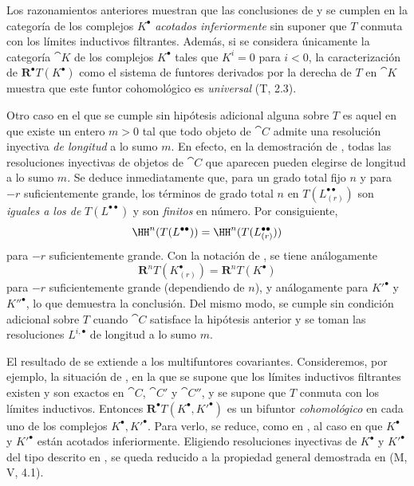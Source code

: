 \documentclass[oneside]{amsart}
\newcommand{\oldpage}[2][]{{\marginnote{\normalfont\textbf{#1}~|~#2}}\ignorespaces}
\let\EGAOriginalLabel\label
\renewcommand{\label}[1]{\phantomsection\EGAOriginalLabel{#1}}
\begin{document}
\begin{remark}[11.5.4]
\label{0.11.5.4}
Los razonamientos anteriores muestran que las conclusiones de  y  se cumplen en la categoría de los complejos $K^\bullet$ \emph{acotados inferiormente} sin suponer que $T$ conmuta con los límites inductivos filtrantes.
Además, si se considera únicamente la categoría $\cat{K}$ de los complejos $K^\bullet$ tales que $K^i=0$ para $i<0$, la caracterización de $\mathbf{R}^\bullet T(K^\bullet)$ como el sistema de funtores derivados por la derecha de $T$ en $\cat{K}$ muestra que este funtor cohomológico es \emph{universal} (T, 2.3).

Otro caso en el que  se cumple sin hipótesis adicional alguna sobre $T$ es aquel en que existe un entero $m>0$ tal que todo objeto de $\cat{C}$ admite una resolución inyectiva \emph{de longitud} a lo sumo $m$.
En efecto, en la demostración de , todas las resoluciones inyectivas de objetos de $\cat{C}$ que aparecen pueden elegirse de longitud a lo sumo $m$.
Se deduce inmediatamente que, para un grado total fijo $n$ y para $-r$ suficientemente grande, los términos de grado total $n$ en $T(L^{\bullet\bullet}_{(r)})$ son \emph{iguales a los de} $T(L^{\bullet\bullet})$ y son \emph{finitos} en número.
Por consiguiente,
\[
  \HH^n(T(L^{\bullet\bullet}))
  =\HH^n(T(L^{\bullet\bullet}_{(r)}))
\]
para $-r$ suficientemente grande.
Con la notación de , se tiene análogamente
\[
  \mathbf{R}^nT(K^\bullet_{(r)})=\mathbf{R}^nT(K^\bullet)
\]
para $-r$ suficientemente grande (dependiendo de $n$), y análogamente para $K'^\bullet$ y $K''^\bullet$, lo que demuestra la conclusión.
Del mismo modo,  se cumple sin condición adicional sobre $T$ cuando $\cat{C}$ satisface la hipótesis anterior y se toman las resoluciones $L^{i,\bullet}$ de longitud a lo sumo $m$.
\end{remark}

\begin{env}[11.5.5]
\label{0.11.5.5}
El resultado de  se extiende a los multifuntores covariantes.
Consideremos, por ejemplo, la situación de , en la que se supone que los límites inductivos filtrantes existen y son exactos en $\cat{C}$, $\cat{C}'$ y $\cat{C}''$,
\oldpage[0\textsubscript{III}]{39}
y se supone que $T$ conmuta con los límites inductivos.
Entonces $\mathbf{R}^\bullet T(K^\bullet,K'^\bullet)$ es un bifuntor \emph{cohomológico} en cada uno de los complejos $K^\bullet,K'^\bullet$.
Para verlo, se reduce, como en , al caso en que $K^\bullet$ y $K'^\bullet$ están acotados inferiormente.
Eligiendo resoluciones inyectivas de $K^\bullet$ y $K'^\bullet$ del tipo descrito en , se queda reducido a la propiedad general demostrada en (M, V, 4.1).
\end{env}
\end{document}
